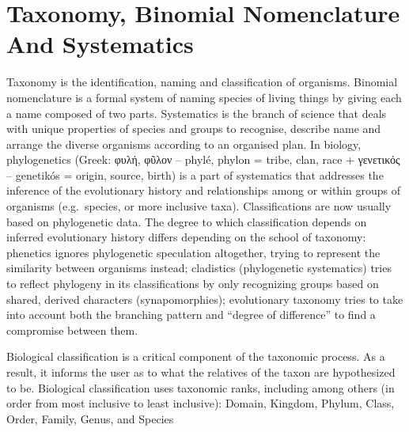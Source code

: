 \hypertarget{taxonomy-binomial-nomenclature-and-systematics}{%
\chapter{Taxonomy, Binomial Nomenclature And Systematics}\label{taxonomy-binomial-nomenclature-and-systematics}}

Taxonomy is the identification, naming and classification of organisms. Binomial nomenclature is a formal system of naming species of living things by giving each a name composed of two parts. Systematics is the branch of science that deals with unique properties of species and groups to recognise, describe name and arrange the diverse organisms according to an organised plan. In biology, phylogenetics (Greek: φυλή, φῦλον -- phylé, phylon = tribe, clan, race + γενετικός -- genetikós = origin, source, birth) is a part of systematics that addresses the inference of the evolutionary history and relationships among or within groups of organisms (e.g.~species, or more inclusive taxa). Classifications are now usually based on phylogenetic data. The degree to which classification depends on inferred evolutionary history differs depending on the school of taxonomy: phenetics ignores phylogenetic speculation altogether, trying to represent the similarity between organisms instead; cladistics (phylogenetic systematics) tries to reflect phylogeny in its classifications by only recognizing groups based on shared, derived characters (synapomorphies); evolutionary taxonomy tries to take into account both the branching pattern and ``degree of difference'' to find a compromise between them.

Biological classification is a critical component of the taxonomic process. As a result, it informs the user as to what the relatives of the taxon are hypothesized to be. Biological classification uses taxonomic ranks, including among others (in order from most inclusive to least inclusive): Domain, Kingdom, Phylum, Class, Order, Family, Genus, and Species




